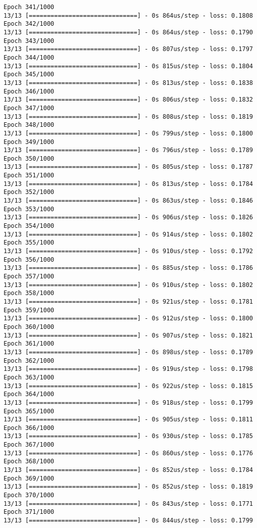 \documentclass[11pt]{article}
\begin{document}
\begin{Verbatim}[commandchars=\\\{\}]
Epoch 341/1000
13/13 [==============================] - 0s 864us/step - loss: 0.1808
Epoch 342/1000
13/13 [==============================] - 0s 864us/step - loss: 0.1790
Epoch 343/1000
13/13 [==============================] - 0s 807us/step - loss: 0.1797
Epoch 344/1000
13/13 [==============================] - 0s 815us/step - loss: 0.1804
Epoch 345/1000
13/13 [==============================] - 0s 813us/step - loss: 0.1838
Epoch 346/1000
13/13 [==============================] - 0s 806us/step - loss: 0.1832
Epoch 347/1000
13/13 [==============================] - 0s 808us/step - loss: 0.1819
Epoch 348/1000
13/13 [==============================] - 0s 799us/step - loss: 0.1800
Epoch 349/1000
13/13 [==============================] - 0s 796us/step - loss: 0.1789
Epoch 350/1000
13/13 [==============================] - 0s 805us/step - loss: 0.1787
Epoch 351/1000
13/13 [==============================] - 0s 813us/step - loss: 0.1784
Epoch 352/1000
13/13 [==============================] - 0s 863us/step - loss: 0.1846
Epoch 353/1000
13/13 [==============================] - 0s 906us/step - loss: 0.1826
Epoch 354/1000
13/13 [==============================] - 0s 914us/step - loss: 0.1802
Epoch 355/1000
13/13 [==============================] - 0s 910us/step - loss: 0.1792
Epoch 356/1000
13/13 [==============================] - 0s 885us/step - loss: 0.1786
Epoch 357/1000
13/13 [==============================] - 0s 910us/step - loss: 0.1802
Epoch 358/1000
13/13 [==============================] - 0s 921us/step - loss: 0.1781
Epoch 359/1000
13/13 [==============================] - 0s 912us/step - loss: 0.1800
Epoch 360/1000
13/13 [==============================] - 0s 907us/step - loss: 0.1821
Epoch 361/1000
13/13 [==============================] - 0s 898us/step - loss: 0.1789
Epoch 362/1000
13/13 [==============================] - 0s 919us/step - loss: 0.1798
Epoch 363/1000
13/13 [==============================] - 0s 922us/step - loss: 0.1815
Epoch 364/1000
13/13 [==============================] - 0s 918us/step - loss: 0.1799
Epoch 365/1000
13/13 [==============================] - 0s 905us/step - loss: 0.1811
Epoch 366/1000
13/13 [==============================] - 0s 930us/step - loss: 0.1785
Epoch 367/1000
13/13 [==============================] - 0s 860us/step - loss: 0.1776
Epoch 368/1000
13/13 [==============================] - 0s 852us/step - loss: 0.1784
Epoch 369/1000
13/13 [==============================] - 0s 852us/step - loss: 0.1819
Epoch 370/1000
13/13 [==============================] - 0s 843us/step - loss: 0.1771
Epoch 371/1000
13/13 [==============================] - 0s 844us/step - loss: 0.1799

\end{Verbatim}
\end{document}

